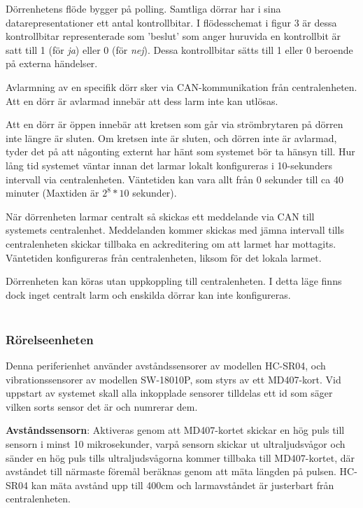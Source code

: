 \documentclass{article}
\begin{document}
Dörrenhetens flöde bygger på polling. Samtliga dörrar har i sina datarepresentationer ett antal kontrollbitar. I flödesschemat i figur 3 är dessa kontrollbitar representerade som 'beslut' som anger huruvida en kontrollbit är satt till 1 (för \textit{ja}) eller 0 (för \textit{nej}). Dessa kontrollbitar sätts till 1 eller 0 beroende på externa händelser.

Avlarmning av en specifik dörr sker via CAN-kommunikation från centralenheten. Att en dörr är avlarmad innebär att dess larm inte kan utlösas.

Att en dörr är öppen innebär att kretsen som går via strömbrytaren på dörren inte längre är sluten. Om kretsen inte är sluten, och dörren inte är avlarmad, tyder det på att någonting externt har hänt som systemet bör ta hänsyn till. Hur lång tid systemet väntar innan det larmar lokalt konfigureras i 10-sekunders intervall via centralenheten. Väntetiden kan vara allt från 0 sekunder till ca 40 minuter (Maxtiden är $2^8 *10$ sekunder).

När dörrenheten larmar centralt så skickas ett meddelande via CAN till systemets centralenhet. Meddelanden kommer skickas med jämna intervall tills centralenheten skickar tillbaka en ackreditering om att larmet har mottagits. Väntetiden konfigureras från centralenheten, liksom för det lokala larmet.

Dörrenheten kan köras utan uppkoppling till centralenheten. I detta läge finns dock inget centralt larm och enskilda dörrar kan inte konfigureras.\\ \\



\subsubsection{Rörelseenheten}
Denna periferienhet använder avståndssensorer av modellen HC-SR04, och vibrationssensorer av modellen SW-18010P, som styrs av ett MD407-kort.
Vid uppstart av systemet skall alla inkopplade sensorer tilldelas ett id som säger vilken sorts sensor det är och numrerar dem.

\textbf{Avståndssensorn}: Aktiveras genom att MD407-kortet skickar en hög puls till sensorn i minst 10 mikrosekunder, 
 varpå sensorn skickar ut ultraljudsvågor och sänder en hög puls tills ultraljudsvågorna kommer tillbaka till MD407-kortet, där avståndet till närmaste föremål beräknas genom att mäta längden på pulsen. 
HC-SR04 kan mäta avstånd upp till 400cm och larmavståndet är justerbart från centralenheten.
\end{document}
